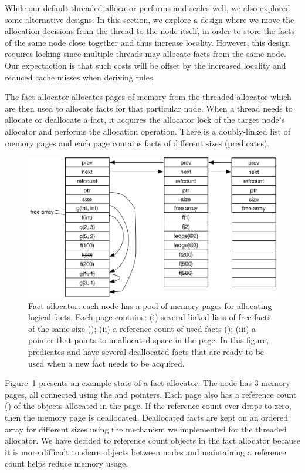 While our default threaded allocator performs and scales well, we also explored
some alternative designs. In this section, we explore a design where we move the
allocation decisions from the thread to the node itself, in order to store the
facts of the same node close together and thus increase locality. However, this
design requires locking since multiple threads may allocate facts from the same
node. Our expectaction is that such costs will be offset by the increased
locality and reduced cache misses when deriving rules.

The fact allocator allocates pages of memory from the threaded allocator which
are then used to allocate facts for that particular node. When a thread needs to
allocate or deallocate a fact, it acquires the allocator lock of the target
node's allocator and performs the allocation operation. There is a doubly-linked
list of memory pages and each page contains facts of different sizes
(predicates).

\begin{figure}[ht]
   \begin{center}
      \includegraphics[width=0.7\linewidth]{figures/implementation/fact_allocator.pdf}
   \end{center}

   \caption{Fact allocator: each node has a pool of memory pages for allocating
      logical facts. Each page contains: (i) several linked lists of free facts
      of the same size (); (ii) a reference count of used
      facts (); (iii) a  pointer that points to
      unallocated space in the page. In this figure, predicates  and
       have several deallocated facts that are ready to be used when a
   new fact needs to be acquired.}

   \label{fig:implementation:fact_allocator}
\end{figure}

Figure~\ref{fig:implementation:fact_allocator} presents an example state of a
fact allocator. The node has 3 memory pages, all connected using the 
and  pointers. Each page also has a reference count ()
of the objects allocated in the page. If the reference count ever drops to zero,
then the memory page is deallocated. Deallocated facts are kept on an ordered
array for different sizes using the mechanism we implemented for the threaded
allocator. We have decided to reference count objects in the fact allocator
because it is more difficult to share objects between nodes and maintaining a
reference count helps reduce memory usage.


